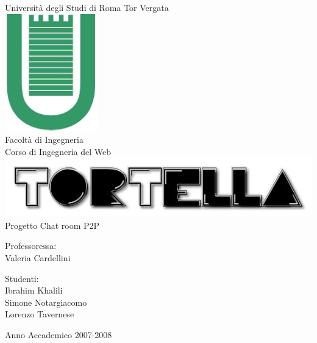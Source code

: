 \begin{titlepage}
\begin{center}
\LARGE{Università degli Studi di Roma Tor Vergata}\\
\vspace{10mm}
\includegraphics[scale=0.50]{etc/logo.jpg}\\
Facoltà di Ingegneria\\
\vspace{5mm}
\normalsize{Corso di Ingegneria del Web}\\
\vspace{20mm}
\includegraphics[scale=0.40]{etc/tortellalogo.jpg}\\
\large{Progetto Chat room P2P}\\
\end{center}
\vspace{40mm}
\begin{minipage}[t]{0.30\textwidth}
\begin{center}
{\normalsize{Professoressa:\\
Valeria Cardellini}}
\end{center}
\end{minipage}
\hfill
\begin{minipage}[t]{0.30\textwidth}
\begin{center}
{\normalsize{Studenti:\\
Ibrahim Khalili\\
Simone Notargiacomo\\
Lorenzo Tavernese}}
\end{center}
\end{minipage}
\vspace{10mm}
\begin{center}
Anno Accademico 2007-2008
\end{center}

\end{titlepage}